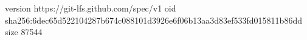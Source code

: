 version https://git-lfs.github.com/spec/v1
oid sha256:6dec65d522104287b674c088101d3926e6f06b13aa3d83ef533fd015811b86dd
size 87544
